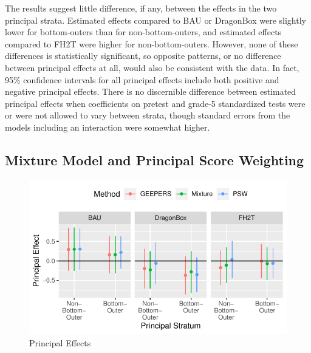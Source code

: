 \documentclass[11pt]{article} %
\begin{document}
The results suggest little difference, if any, between the effects in the two principal strata.
Estimated effects compared to BAU or DragonBox were slightly lower for bottom-outers than for non-bottom-outers, and estimated effects compared to FH2T were higher for non-bottom-outers.
However, none of these differences is statistically significant, so opposite patterns, or no difference between principal effects at all, would also be consistent with the data.
In fact, 95\% confidence intervals for all principal effects include both positive and negative principal effects.
There is no discernible difference between estimated principal effects when coefficients on pretest and grade-5 standardized tests were or were not allowed to vary between strata, though standard errors from the models including an interaction were somewhat higher.

\subsection{Mixture Model and Principal Score Weighting}
\begin{figure}
  \centering
  \includegraphics{../figure/compareMethods.pdf}
  \caption{Principal Effects}
  \label{fig:compare}
\end{figure}
\end{document}
